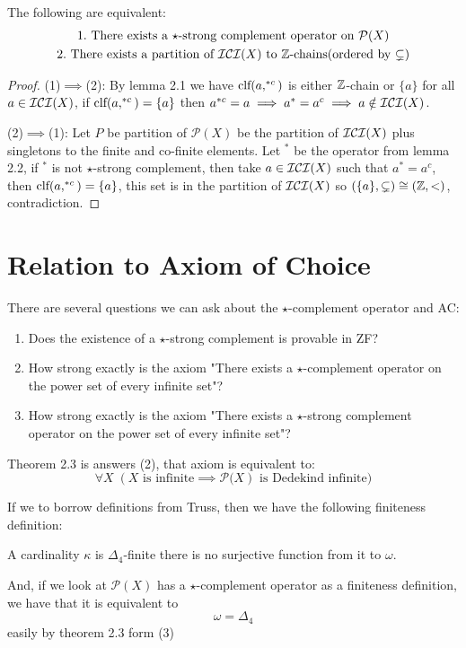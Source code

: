 	\begin{theorem}
		The following are equivalent:
		\begin{gather*}
			1.\mbox{ There exists a $\star$-strong complement operator on $\mathcal{P}(X)$}\\
			2.\mbox{ There exists a partition of $\mathcal{ICI}(X)$ to $\Bbb{Z}$-chains(ordered by $\subsetneq$)}
		\end{gather*}
	\end{theorem}
	\begin{proof}
		(1)$\implies$(2): By lemma 2.1 we have $\mbox{clf}(a,^{*c})$ is either $\Bbb Z$-chain or $\{a\}$ for all $a\in\mathcal{ICI}(X)$, if $\mbox{clf}(a,^{*c})=\{a\}$ then $a^{*c}=a\implies a^*=a^c\implies a\notin \mathcal{ICI}(X)$.
		
		(2)$\implies$(1): Let $P$ be partition of $\mathcal{P}(X)$ be the partition of $\mathcal{ICI}(X)$ plus singletons to the finite and co-finite elements. Let $^*$ be the operator from lemma 2.2, if $^*$ is not $\star$-strong complement, then take $a\in\mathcal{ICI}(X)$ such that $a^*=a^c$, then $\mbox{clf}(a,^{*c})=\{a\}$, this set is in the partition of $\mathcal{ICI}(X)$ so $(\{a\},\subsetneq)\cong(\Bbb Z,<)$, contradiction.
	\end{proof}
	
	\section{Relation to Axiom of Choice}
	There are several questions we can ask about the $\star$-complement operator and AC:
	\begin{enumerate}
		\item{ Does the existence of a $\star$-strong complement is provable in ZF?}
		\item{ How strong exactly is the axiom "There exists a $\star$-complement operator}{ on the power set of every infinite set"?}
		\item{ How strong exactly is the axiom "There exists a $\star$-strong complement}{ operator on the power set of every infinite set"?}
	\end{enumerate}
	
	Theorem 2.3 is answers (2), that axiom is equivalent to: $$\forall X\;(X\mbox{ is infinite}\implies\mathcal{P(}X)\mbox{ is Dedekind infinite})$$
	
	If we to borrow definitions from Truss\cite{ClassesOfDedekindDiniteCardinals}, then we have the following finiteness definition:
	
	\begin{definition}
		A cardinality $\kappa$ is $\Delta_4$-finite
		there is no surjective function from it to $\omega$.
	\end{definition}
	
	And, if we look at $\mathcal{P}(X)$ has a $\star$-complement operator as a finiteness definition, we have that it is equivalent to $$\omega=\Delta_4$$ easily by theorem 2.3 form (3)
	
	\medskip
	
	
	





